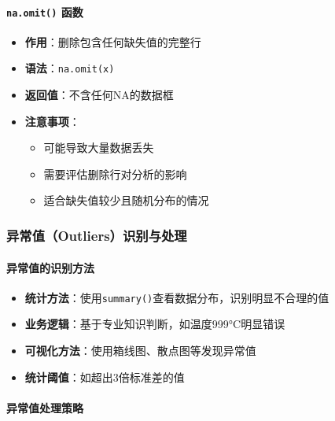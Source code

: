 \documentclass[
  twoside]{book}
\providecommand{\tightlist}{%
  \setlength{\itemsep}{0pt}\setlength{\parskip}{0pt}}
\begin{document}
\hypertarget{na.omit-ux51fdux6570}{%
\paragraph{\texorpdfstring{\texttt{na.omit()} 函数}{na.omit() 函数}}\label{na.omit-ux51fdux6570}}

\begin{itemize}
\tightlist
\item
  \textbf{作用}：删除包含任何缺失值的完整行
\item
  \textbf{语法}：\texttt{na.omit(x)}
\item
  \textbf{返回值}：不含任何NA的数据框
\item
  \textbf{注意事项}：

  \begin{itemize}
  \tightlist
  \item
    可能导致大量数据丢失
  \item
    需要评估删除行对分析的影响
  \item
    适合缺失值较少且随机分布的情况
  \end{itemize}
\end{itemize}

\hypertarget{ux5f02ux5e38ux503coutliersux8bc6ux522bux4e0eux5904ux7406}{%
\subsubsection{异常值（Outliers）识别与处理}\label{ux5f02ux5e38ux503coutliersux8bc6ux522bux4e0eux5904ux7406}}

\hypertarget{ux5f02ux5e38ux503cux7684ux8bc6ux522bux65b9ux6cd5}{%
\paragraph{异常值的识别方法}\label{ux5f02ux5e38ux503cux7684ux8bc6ux522bux65b9ux6cd5}}

\begin{itemize}
\tightlist
\item
  \textbf{统计方法}：使用\texttt{summary()}查看数据分布，识别明显不合理的值
\item
  \textbf{业务逻辑}：基于专业知识判断，如温度999°C明显错误
\item
  \textbf{可视化方法}：使用箱线图、散点图等发现异常值
\item
  \textbf{统计阈值}：如超出3倍标准差的值
\end{itemize}

\hypertarget{ux5f02ux5e38ux503cux5904ux7406ux7b56ux7565}{%
\paragraph{异常值处理策略}\label{ux5f02ux5e38ux503cux5904ux7406ux7b56ux7565}}
\end{document}

